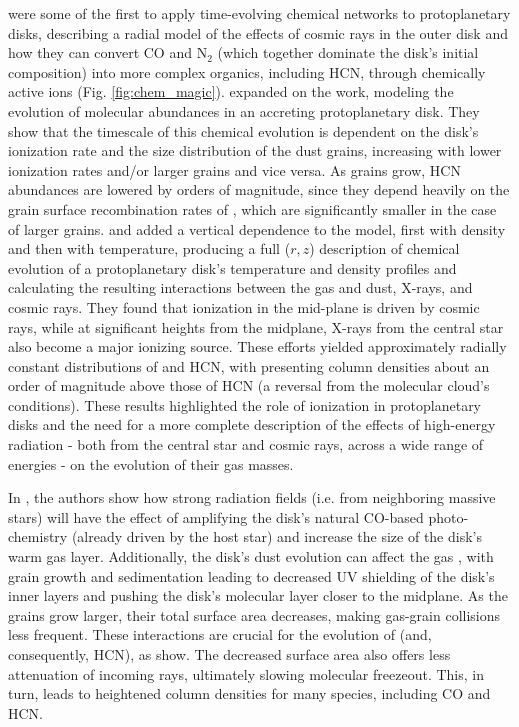 \citet{Aikawa1997} were some of the first to apply time-evolving chemical networks to protoplanetary disks, describing a radial model of the effects of cosmic rays in the outer disk and how they can convert CO and N$_2$ (which together dominate the disk's initial composition) into more complex organics, including HCN, through chemically active ions (Fig. \ref{fig:chem_magic}). \citet{Aikawa1999} expanded on the work, modeling the evolution of molecular abundances in an accreting protoplanetary disk. They show that the timescale of this chemical evolution is dependent on the disk's ionization rate and the size distribution of the dust grains, increasing with lower ionization rates and/or larger grains and vice versa. As grains grow, HCN abundances are lowered by orders of magnitude, since they depend heavily on the grain surface recombination rates of \hco \citep{Aikawa1999b}, which are significantly smaller in the case of larger grains. \citet{AikawaHerbst1999a} and \citet{Aikawa2002} added a vertical dependence to the model, first with density and then with temperature, producing a full ($r, z$) description of chemical evolution of a protoplanetary disk's temperature and density profiles and calculating the resulting interactions between the gas and dust, X-rays, and cosmic rays. They found that ionization in the mid-plane is driven by cosmic rays, while at significant heights from the midplane, X-rays from the central star also become a major ionizing source. These efforts yielded approximately radially constant distributions of \hco and HCN, with \hco presenting column densities about an order of magnitude above those of HCN (a reversal from the molecular cloud's conditions). These results highlighted the role of ionization in protoplanetary disks and the need for a more complete description of the effects of high-energy radiation - both from the central star and cosmic rays, across a wide range of energies - on the evolution of their gas masses.



In \citet{Fogel2011}, the authors show how strong radiation fields (i.e. from neighboring massive stars) will have the effect of amplifying the disk's natural CO-based photo-chemistry (already driven by the host star) and increase the size of the disk's warm gas layer. Additionally, the disk's dust evolution can affect the gas \citep{Fogel2011,Akimkin2013}, with grain growth and sedimentation leading to decreased UV shielding of the disk's inner layers and pushing the disk's molecular layer closer to the midplane. As the grains grow larger, their total surface area decreases, making gas-grain collisions less frequent. These interactions are crucial for the evolution of \hco (and, consequently, HCN), as \citet{Aikawa1999b} show. The decreased surface area also offers less attenuation of incoming rays, ultimately slowing molecular freezeout. This, in turn, leads to heightened column densities for many species, including CO and HCN.



